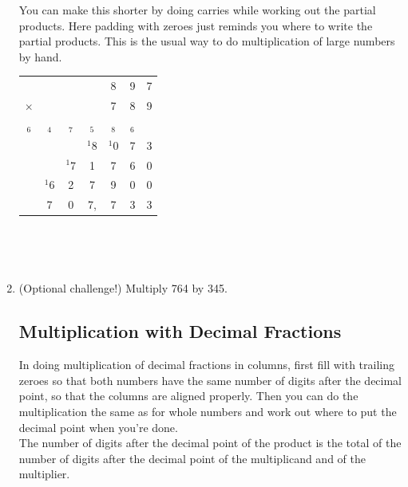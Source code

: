 \documentclass[12pt]{article}
\begin{document}
\begin{enumerate}
\vspace{32pt}
You can make this shorter by doing carries while working out the partial products. Here padding with zeroes just reminds you where to write the partial products. This is the usual way to do multiplication of large numbers by hand.

\begin{center}
\begin{tabular}{c@{\,}c@{\,}c@{\,}c@{\,}c@{\,}c@{\,}c}
           &&&&8&9&7\\
    $\times$ &&&&7&8&9\\
  $_6$&$_4$&$_7$&$_5$&$_8$&$_6$&\\
\hline
  &&&$^{1}$8&$^{1}$0&7&3\\
     &&$^{1}$7&1&7&6&0\\
    &$^{1}$6&2&7&9&0&0\\
\hline
       &7&0&7,&7&3&3\\
\hline
\hline
\end{tabular}\\
\end{center}

\\
\item (Optional challenge!) Multiply 764 by 345.

\newpage

\subsection*{Multiplication with Decimal Fractions}

In doing multiplication of decimal fractions in columns, first fill with trailing zeroes so that both numbers have the same number of digits after the decimal point, so that the columns are aligned properly. Then you can do the multiplication the same as for whole numbers and work out where to put the decimal point when you're done.\\

The number of digits after the decimal point of the product is the total of the number of digits after the decimal point of the multiplicand and of the multiplier.\\


\end{enumerate}
\end{document}
